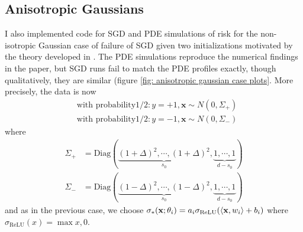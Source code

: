 \documentclass{article}
\begin{document}
\subsection{Anisotropic Gaussians}

I also implemented code for SGD and PDE simulations of risk for the non-isotropic Gaussian case of failure of SGD given two initializations motivated by the theory developed in \cite{Mei_2018}. The PDE simulations reproduce the numerical findings in the paper, but SGD runs fail to match the PDE profiles exactly, though qualitatively, they are similar (figure \ref{fig: anisotropic gaussian case plots}. More precisely, the data is now 
\begin{equation}
\begin{array}{cc}
& \text{with probability}  1/2: y = +1, \mathbf{x}\sim N(0, \Sigma_+)\\
& \text{with probability}  1/2: y = -1, \mathbf{x}\sim N(0, \Sigma_-)
\end{array}
\end{equation}
where 
\begin{equation}
\begin{array}{cc}
	\Sigma_+ &= \text{Diag}(\underbrace{(1+\Delta)^{2}, \cdots, (1+\Delta)^{2}}_{s_0}, \underbrace{1,\cdots, 1}_{d-s_0})\\ 
 \Sigma_- &= \text{Diag}(\underbrace{(1-\Delta)^{2}, \cdots, (1-\Delta)^{2}}_{s_0}, \underbrace{1,\cdots, 1}_{d-s_0})
\end{array}
\end{equation}
and as in the previous case, we choose $\sigma_*(\mathbf{x};\mathbf{\theta}_{i})=a_{i}\sigma_{\text{ReLU}}(\langle \mathbf{x}, w_{i}\rangle+b_{i})$  where $ \sigma_{\text{ReLU}}(x) = \max{x,0}$.
\end{document}
